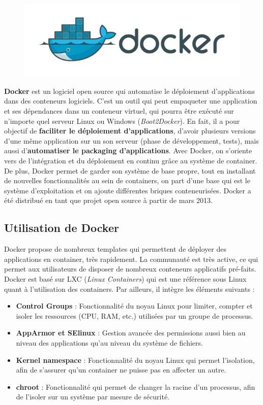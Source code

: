 \begin{onehalfspace}
\begin{figure}
\centering
\includegraphics[scale=0.15]{chapitre2/assets/docker}
\end{figure}
\noindent \textbf{Docker} est un logiciel open source qui automatise le déploiement d'applications dans des conteneurs logiciels. C'est un outil qui peut empaqueter une application et ses dépendances dans un conteneur virtuel, qui pourra être exécuté sur n'importe quel serveur Linux ou Windows (\emph{Boot2Docker}). En fait, il a pour objectif de \textbf{faciliter le déploiement d’applications}, d’avoir plusieurs versions d’une même application sur un son serveur (phase de développement, tests), mais aussi d’\textbf{automatiser le packaging d’applications}. Avec Docker, on s’oriente vers de l’intégration et du déploiement en continu grâce au système de container. De plus, Docker permet de garder son système de base propre, tout en installant de nouvelles fonctionnalités au sein de containers, on part d’une base qui est le système d’exploitation et on ajoute différentes briques conteneurisées. Docker a été distribué en tant que projet open source à partir de mars 2013.

\subsection{Utilisation de Docker}
Docker propose de nombreux templates qui permettent de déployer des applications en container, très rapidement. La communauté est très active, ce qui permet aux utilisateurs de disposer de nombreux conteneurs applicatifs pré-faits.
Docker est basé sur LXC (\emph{Linux Containers}) qui est une référence sous Linux quant à l’utilisation des containers. Par ailleurs, il intègre les éléments suivants :
\begin{itemize}
\item \textbf{Control Groups} : Fonctionnalité du noyau Linux pour limiter, compter et isoler les ressources (CPU, RAM, etc.) utilisées par un groupe de processus.
\item \textbf{AppArmor et SElinux} : Gestion avancée des permissions aussi bien au niveau des applications qu’au niveau du système de fichiers.
\item \textbf{Kernel namespace} : Fonctionnalité du noyau Linux qui permet l’isolation, afin de s’assurer qu’un container ne puisse pas en affecter un autre.
\item \textbf{chroot} : Fonctionnalité qui permet de changer la racine d’un processus, afin de l’isoler sur un système par mesure de sécurité.
\end{itemize}


\end{onehalfspace}
